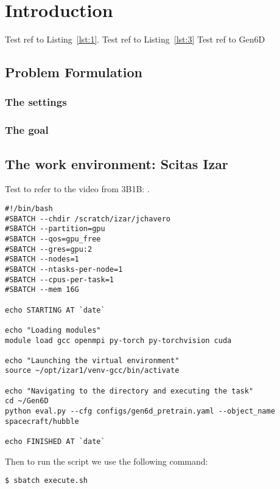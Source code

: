 
\chapter{Introduction}\label{chapter:introduction}
Test ref to Listing~\ref{lst:1}. Test ref to Listing~\ref{lst:3}
Test ref to Gen6D \cite{liu2023gen6d}
\section{Problem Formulation}
\subsection{The settings}
\subsection{The goal}
\section{The work environment: Scitas Izar}
Test to refer to the video from 3B1B: \cite{3b1b-1}.

\begin{lstlisting}[style=bashstyle, caption={Bash script \texttt{execute.sh} to run a machine learning model on Scitas Izar EPFL. While the overall structure remains consistent, this script is specific to Gen6D's architecture, further discussed later.}]
#!/bin/bash
#SBATCH --chdir /scratch/izar/jchavero
#SBATCH --partition=gpu
#SBATCH --qos=gpu_free
#SBATCH --gres=gpu:2
#SBATCH --nodes=1
#SBATCH --ntasks-per-node=1
#SBATCH --cpus-per-task=1
#SBATCH --mem 16G

echo STARTING AT `date`

echo "Loading modules"
module load gcc openmpi py-torch py-torchvision cuda

echo "Launching the virtual environment"
source ~/opt/izar1/venv-gcc/bin/activate

echo "Navigating to the directory and executing the task"
cd ~/Gen6D                                    
python eval.py --cfg configs/gen6d_pretrain.yaml --object_name spacecraft/hubble

echo FINISHED AT `date`
\end{lstlisting}

\noindent Then to run the script we use the following command:
\begin{lstlisting}[style=bashstyle, caption=Linux command to run the bash script.]
	$ sbatch execute.sh
\end{lstlisting}